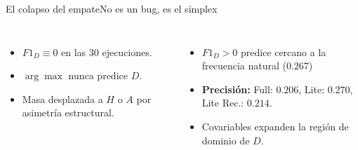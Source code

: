 \documentclass[aspectratio=169,11pt]{beamer}
\begin{document}
\begin{frame}{El colapso del empate}{No es un bug, es el simplex}
	\vspace*{-0.6cm}
	\begin{columns}[T,onlytextwidth]
		\par\vskip 2mm
		\footnotesize
		\begin{itemize}
			\item $F1_D \equiv 0$ en las 30 ejecuciones.
			\item $\arg\max$ nunca predice $D$.
			\item Masa desplazada a $H$ o $A$ por asimetr\'ia estructural.
		\end{itemize}
		\par\vskip 2mm
		\footnotesize
		\begin{itemize}
			\item $F1_D > 0$ predice cercano a la frecuencia natural ($0{.}267$)
			\item \textbf{Precisi\'on:} Full: $0{.}206$, Lite: $0{.}270$, Lite Rec.: $0{.}214$.
			\item Covariables expanden la regi\'on de dominio de $D$.
		\end{itemize}
	\end{columns}
	\vskip 2mm
\end{frame}
\end{document}
